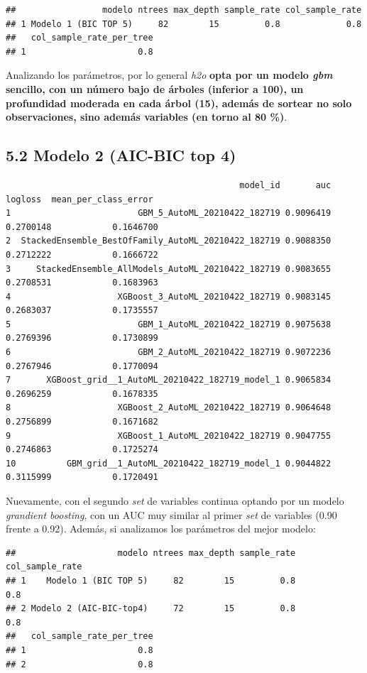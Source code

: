 \documentclass[
]{article}
\begin{document}
\begin{verbatim}
##                 modelo ntrees max_depth sample_rate col_sample_rate
## 1 Modelo 1 (BIC TOP 5)     82        15         0.8             0.8
##   col_sample_rate_per_tree
## 1                      0.8
\end{verbatim}

Analizando los parámetros, por lo general \emph{h2o} \textbf{opta por un
modelo \emph{gbm} sencillo, con un número bajo de árboles (inferior a
100), un profundidad moderada en cada árbol (15), además de sortear no
solo observaciones, sino además variables (en torno al 80 \%)}.

\hypertarget{modelo-2-aic-bic-top-4}{%
\subsection{5.2 Modelo 2 (AIC-BIC top 4)}\label{modelo-2-aic-bic-top-4}}

\begin{verbatim}
                                              model_id       auc   logloss  mean_per_class_error
1                         GBM_5_AutoML_20210422_182719 0.9096419 0.2700148            0.1646700
2  StackedEnsemble_BestOfFamily_AutoML_20210422_182719 0.9088350 0.2712222            0.1666722
3     StackedEnsemble_AllModels_AutoML_20210422_182719 0.9083655 0.2708531            0.1683963
4                     XGBoost_3_AutoML_20210422_182719 0.9083145 0.2683037            0.1735557
5                         GBM_1_AutoML_20210422_182719 0.9075638 0.2769396            0.1730899
6                         GBM_2_AutoML_20210422_182719 0.9072236 0.2767946            0.1770094
7       XGBoost_grid__1_AutoML_20210422_182719_model_1 0.9065834 0.2696259            0.1678335
8                     XGBoost_2_AutoML_20210422_182719 0.9064648 0.2756899            0.1671682
9                     XGBoost_1_AutoML_20210422_182719 0.9047755 0.2746863            0.1725274
10          GBM_grid__1_AutoML_20210422_182719_model_1 0.9044822 0.3115999            0.1720491
\end{verbatim}

Nuevamente, con el segundo \emph{set} de variables continua optando por
un modelo \emph{grandient boosting}, con un AUC muy similar al primer
\emph{set} de variables (0.90 frente a 0.92). Además, si analizamos los
parámetros del mejor modelo:

\begin{verbatim}
##                    modelo ntrees max_depth sample_rate col_sample_rate
## 1    Modelo 1 (BIC TOP 5)     82        15         0.8             0.8
## 2 Modelo 2 (AIC-BIC-top4)     72        15         0.8             0.8
##   col_sample_rate_per_tree
## 1                      0.8
## 2                      0.8
\end{verbatim}
\end{document}
